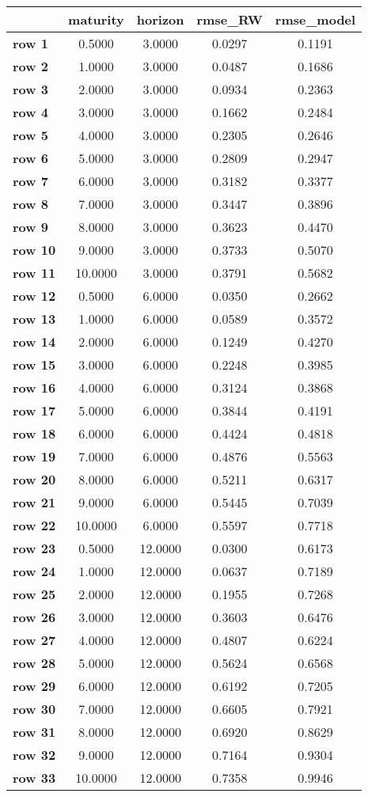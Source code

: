 \begin{tiny}\begin{tabular}{|l|c|c|c|c|}
\hline
&\textbf{maturity}&\textbf{horizon}&\textbf{rmse_RW}&\textbf{rmse_model}\\\hline
\textbf{row 1}&0.5000&3.0000&0.0297&0.1191\\\hline
\textbf{row 2}&1.0000&3.0000&0.0487&0.1686\\\hline
\textbf{row 3}&2.0000&3.0000&0.0934&0.2363\\\hline
\textbf{row 4}&3.0000&3.0000&0.1662&0.2484\\\hline
\textbf{row 5}&4.0000&3.0000&0.2305&0.2646\\\hline
\textbf{row 6}&5.0000&3.0000&0.2809&0.2947\\\hline
\textbf{row 7}&6.0000&3.0000&0.3182&0.3377\\\hline
\textbf{row 8}&7.0000&3.0000&0.3447&0.3896\\\hline
\textbf{row 9}&8.0000&3.0000&0.3623&0.4470\\\hline
\textbf{row 10}&9.0000&3.0000&0.3733&0.5070\\\hline
\textbf{row 11}&10.0000&3.0000&0.3791&0.5682\\\hline
\textbf{row 12}&0.5000&6.0000&0.0350&0.2662\\\hline
\textbf{row 13}&1.0000&6.0000&0.0589&0.3572\\\hline
\textbf{row 14}&2.0000&6.0000&0.1249&0.4270\\\hline
\textbf{row 15}&3.0000&6.0000&0.2248&0.3985\\\hline
\textbf{row 16}&4.0000&6.0000&0.3124&0.3868\\\hline
\textbf{row 17}&5.0000&6.0000&0.3844&0.4191\\\hline
\textbf{row 18}&6.0000&6.0000&0.4424&0.4818\\\hline
\textbf{row 19}&7.0000&6.0000&0.4876&0.5563\\\hline
\textbf{row 20}&8.0000&6.0000&0.5211&0.6317\\\hline
\textbf{row 21}&9.0000&6.0000&0.5445&0.7039\\\hline
\textbf{row 22}&10.0000&6.0000&0.5597&0.7718\\\hline
\textbf{row 23}&0.5000&12.0000&0.0300&0.6173\\\hline
\textbf{row 24}&1.0000&12.0000&0.0637&0.7189\\\hline
\textbf{row 25}&2.0000&12.0000&0.1955&0.7268\\\hline
\textbf{row 26}&3.0000&12.0000&0.3603&0.6476\\\hline
\textbf{row 27}&4.0000&12.0000&0.4807&0.6224\\\hline
\textbf{row 28}&5.0000&12.0000&0.5624&0.6568\\\hline
\textbf{row 29}&6.0000&12.0000&0.6192&0.7205\\\hline
\textbf{row 30}&7.0000&12.0000&0.6605&0.7921\\\hline
\textbf{row 31}&8.0000&12.0000&0.6920&0.8629\\\hline
\textbf{row 32}&9.0000&12.0000&0.7164&0.9304\\\hline
\textbf{row 33}&10.0000&12.0000&0.7358&0.9946\\\hline
\end{tabular}
\end{tiny}